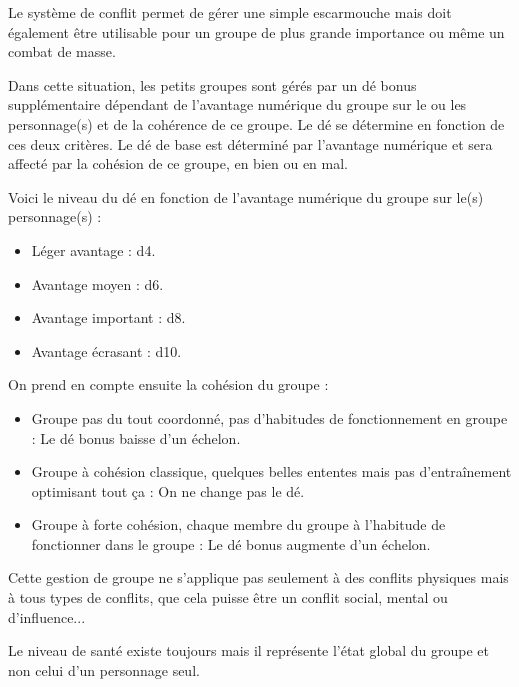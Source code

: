 Le système de conflit permet de gérer une simple escarmouche mais doit également être utilisable pour un groupe de plus grande importance ou même un combat de masse.

Dans cette situation, les petits groupes sont gérés par un dé bonus supplémentaire dépendant de l'avantage numérique du groupe sur le ou les personnage(s) et de la cohérence de ce groupe. Le dé se détermine en fonction de ces deux critères. Le dé de base est déterminé par l'avantage numérique et sera affecté par la cohésion de ce groupe, en bien ou en mal.

Voici le niveau du dé en fonction de l'avantage numérique du groupe sur le(s) personnage(s) :

\begin{itemize}
\item Léger avantage : d4.
\item Avantage moyen : d6.
\item Avantage important : d8.
\item Avantage écrasant : d10.
\end{itemize}

On prend en compte ensuite la cohésion du groupe :

\begin{itemize}
\item Groupe pas du tout coordonné, pas d'habitudes de fonctionnement en groupe : Le dé bonus baisse d'un échelon.
\item Groupe à cohésion classique, quelques belles ententes mais pas d'entraînement optimisant tout ça : On ne change pas le dé.
\item Groupe à forte cohésion, chaque membre du groupe à l'habitude de fonctionner dans le groupe : Le dé bonus augmente d'un échelon.
\end{itemize}

Cette gestion de groupe ne s'applique pas seulement à des conflits physiques mais à tous types de conflits, que cela puisse être un conflit social, mental ou d'influence...

Le niveau de santé existe toujours mais il représente l'état global du groupe et non celui d'un personnage seul.


